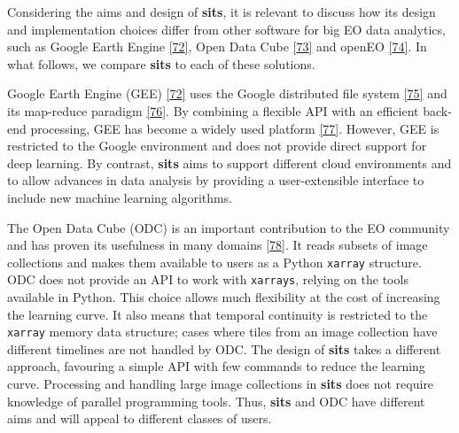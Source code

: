 \documentclass[
  11pt,
]{report}
\begin{document}
Considering the aims and design of \textbf{sits}, it is relevant to
discuss how its design and implementation choices differ from other
software for big EO data analytics, such as Google Earth Engine
\protect\hyperlink{ref-Gorelick2017}{{[}72{]}}, Open Data Cube
\protect\hyperlink{ref-Lewis2017}{{[}73{]}} and openEO
\protect\hyperlink{ref-Schramm2021}{{[}74{]}}. In what follows, we
compare \textbf{sits} to each of these solutions.

Google Earth Engine (GEE) \protect\hyperlink{ref-Gorelick2017}{{[}72{]}}
uses the Google distributed file system
\protect\hyperlink{ref-Ghemawat2003}{{[}75{]}} and its map-reduce
paradigm \protect\hyperlink{ref-Dean2008}{{[}76{]}}. By combining a
flexible API with an efficient back-end processing, GEE has become a
widely used platform \protect\hyperlink{ref-Amani2020}{{[}77{]}}.
However, GEE is restricted to the Google environment and does not
provide direct support for deep learning. By contrast, \textbf{sits}
aims to support different cloud environments and to allow advances in
data analysis by providing a user-extensible interface to include new
machine learning algorithms.

The Open Data Cube (ODC) is an important contribution to the EO
community and has proven its usefulness in many domains
\protect\hyperlink{ref-Giuliani2020}{{[}78{]}}. It reads subsets of
image collections and makes them available to users as a Python
\texttt{xarray} structure. ODC does not provide an API to work with
\texttt{xarrays}, relying on the tools available in Python. This choice
allows much flexibility at the cost of increasing the learning curve. It
also means that temporal continuity is restricted to the \texttt{xarray}
memory data structure; cases where tiles from an image collection have
different timelines are not handled by ODC. The design of \textbf{sits}
takes a different approach, favouring a simple API with few commands to
reduce the learning curve. Processing and handling large image
collections in \textbf{sits} does not require knowledge of parallel
programming tools. Thus, \textbf{sits} and ODC have different aims and
will appeal to different classes of users.
\end{document}
